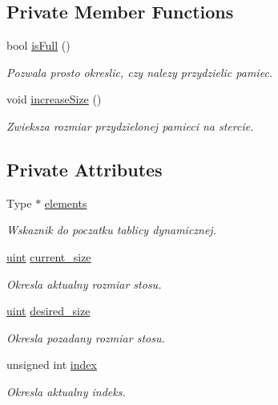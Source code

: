 \subsection*{Private Member Functions}
\begin{DoxyCompactItemize}
\item 
bool \hyperlink{class_tablica_afbabf1c6a51051bd69c04e6c7306938c}{is\-Full} ()
\begin{DoxyCompactList}\small\item\em Pozwala prosto okreslic, czy nalezy przydzielic pamiec. \end{DoxyCompactList}\item 
void \hyperlink{class_tablica_a6c8a0a055eb2bda8e7e76cc5b7690652}{increase\-Size} ()
\begin{DoxyCompactList}\small\item\em Zwieksza rozmiar przydzielonej pamieci na stercie. \end{DoxyCompactList}\end{DoxyCompactItemize}
\subsection*{Private Attributes}
\begin{DoxyCompactItemize}
\item 
Type $\ast$ \hyperlink{class_tablica_a03f7862b518bdd503051388389949257}{elements}
\begin{DoxyCompactList}\small\item\em Wskaznik do poczatku tablicy dynamicznej. \end{DoxyCompactList}\item 
\hyperlink{_i_lista_8h_a91ad9478d81a7aaf2593e8d9c3d06a14}{uint} \hyperlink{class_tablica_aa2313b2db3dfda306acaf2a28be00707}{current\-\_\-size}
\begin{DoxyCompactList}\small\item\em Okresla aktualny rozmiar stosu. \end{DoxyCompactList}\item 
\hyperlink{_i_lista_8h_a91ad9478d81a7aaf2593e8d9c3d06a14}{uint} \hyperlink{class_tablica_ab9bd8738c20ec1d02ceff156af4675bc}{desired\-\_\-size}
\begin{DoxyCompactList}\small\item\em Okresla pozadany rozmiar stosu. \end{DoxyCompactList}\item 
unsigned int \hyperlink{class_tablica_ab05112ff73217668c456d7a92273574e}{index}
\begin{DoxyCompactList}\small\item\em Okresla aktualny indeks. \end{DoxyCompactList}\end{DoxyCompactItemize}


